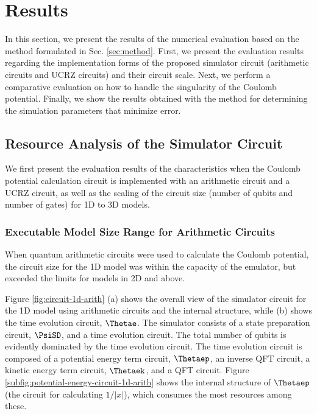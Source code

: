 \documentclass[manuscript_main.tex]{subfiles}
\begin{document}
\section{Results}
In this section, we present the results of the numerical evaluation based on the
method formulated in Sec. \ref{sec:method}. First, we present the evaluation results regarding
the implementation forms of the proposed simulator circuit (arithmetic circuits
and UCRZ circuits) and their circuit scale. Next, we perform a comparative
evaluation on how to handle the singularity of the Coulomb potential. Finally,
we show the results obtained with the method for determining the simulation
parameters that minimize error.

\subsection{Resource Analysis of the Simulator Circuit}
\label{subsec:circuit-configuration-results}
We first present the evaluation results of the characteristics when the Coulomb
potential calculation circuit is implemented with an arithmetic circuit and a
UCRZ circuit, as well as the scaling of the circuit size (number of qubits and
number of gates) for 1D to 3D models.

\subsubsection{Executable Model Size Range for Arithmetic Circuits}
\label{subsubsec:arithmetic-circuit-configuration-results}
When quantum arithmetic circuits were used to calculate the Coulomb potential,
the circuit size for the 1D model was within the capacity of the emulator, but
exceeded the limits for models in 2D and above.

Figure \ref{fig:circuit-1d-arith} (a) shows the overall view of the simulator
circuit for the 1D model using arithmetic circuits and the internal structure,
while (b) shows the time evolution circuit, $\Thetae$. The simulator consists of
a state preparation circuit, $\PsiSD$, and a time evolution circuit. The total
number of qubits is evidently dominated by the time evolution circuit. The time
evolution circuit is composed of a potential energy term circuit, $\Thetaep$, an
inverse QFT circuit, a kinetic energy term circuit, $\Thetaek$, and a QFT
circuit. Figure \ref{subfig:potential-energy-circuit-1d-arith} shows the
internal structure of $\Thetaep$ (the circuit for calculating $1/|x|$), which
consumes the most resources among these.
\end{document}
